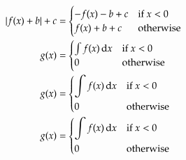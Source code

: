 \begin{align}
    |f(x) + b| + c & =  \begin{cases}
                            -f(x) - b + c & \textrm{if } x < 0 \\
                            f(x) + b + c & \textrm{otherwise}
                        \end{cases} \label{e:abs}\\
    g(x) & =    \begin{cases}
                    \int f(x)\,\mathrm{d}x & \textrm{if } x < 0\\
                    0 & \textrm{otherwise}
                \end{cases} \label{e:case} \\
    g(x) & =    \begin{dcases}
                    \int f(x)\,\mathrm{d}x & \textrm{if } x < 0\\
                    0 & \textrm{otherwise}
                \end{dcases} \label{e:dcases} \\
    g(x) & =    \begin{dcases*}
                    \int f(x)\,\mathrm{d}x & if $x < 0$\\
                    0 & otherwise
                \end{dcases*} \label{e:dcases*}             
\end{align}
%
